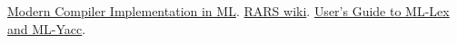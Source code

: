 \documentclass{CSEThesis}
\begin{document}


% 

% 

\tableofcontents 



\def\headrulehook{\color{black}}      %

\typeout{}

\cleardoublepage 
\typeout{}

\cleardoublepage 
\typeout{}

\cleardoublepage 
\typeout{}

\cleardoublepage 
\typeout{}

\typeout{}

% 
% 
\begin{thebibliography}{9}
  \href{https://www.cs.princeton.edu/~appel/modern/ml/}{Modern Compiler Implementation in ML}.   
  \href{https://github.com/TheThirdOne/rars/wiki}{RARS wiki}.   
  \href{http://www.cs.tufts.edu/comp/181/ug.pdf}{User's Guide to ML-Lex and ML-Yacc}.
  \end{thebibliography}
\end{document}
